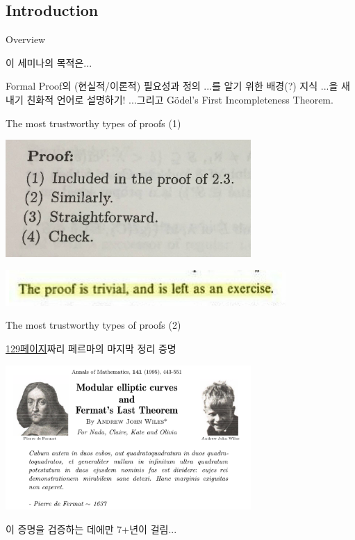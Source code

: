\documentclass[../231120_msquare_computational-logic.tex]{subfiles}
\begin{document}
\subsection{Introduction}

\begin{frame}{Overview}
    \begin{block}{이 세미나의 목적은...}
        \begin{enumerate}
            \ii Formal Proof의 (현실적/이론적) 필요성과 정의 \pause
            \ii ...를 알기 위한 배경(?) 지식 \pause
            \ii ...을 새내기 친화적 언어로 설명하기! \pause
            \ii ...그리고 Gödel's First Incompleteness Theorem.
        \end{enumerate}
    \end{block}
\end{frame}

\begin{frame}{The most trustworthy types of proofs (1)}
    \begin{center}
        \includegraphics[width=0.7\textwidth]{./left_to_readers1.png}
    \end{center}
    \begin{center}
        \includegraphics[width=0.8\textwidth]{./left_to_readers2.png}
    \end{center}
\end{frame}

\begin{frame}{The most trustworthy types of proofs (2)}
    \begin{center}
        {\ul{129페이지}짜리 페르마의 마지막 정리 증명}
    \end{center}
    \begin{center}
        \includegraphics[width=0.7\textwidth]{./wiles_proof.png}
    \end{center}
    \pause
    \begin{center}
        이 증명을 검증하는 데에만 7+년이 걸림...
    \end{center}
\end{frame}
\end{document}
